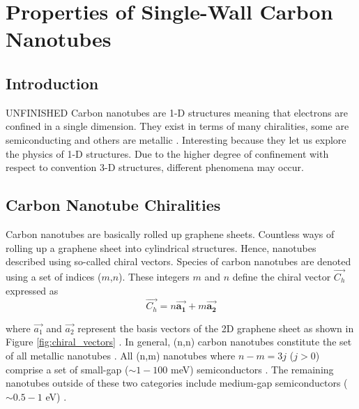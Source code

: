 \chapter{Properties of Single-Wall Carbon Nanotubes}

\section{Introduction}
{\color{red}UNFINISHED} Carbon nanotubes are 1-D structures meaning that electrons are confined in a single dimension. They exist in terms of many chiralities, some are semiconducting and others are metallic \cite{soavi2016ultrafast}. Interesting because they let us explore the physics of 1-D structures. Due to the higher degree of confinement with respect to convention 3-D structures, different phenomena may occur.



\section{Carbon Nanotube Chiralities}

Carbon nanotubes are basically rolled up graphene sheets. Countless ways of rolling up a graphene sheet into cylindrical structures. Hence, nanotubes described using so-called chiral vectors. Species of carbon nanotubes are denoted using a set of indices ($m$,$n$). These integers $m$ and $n$ define the chiral vector $\vec{C_h }$ expressed as 
\begin{equation}
	\vec{C_h} = n \bm{\vec{a_1}} + m \bm{\vec{a_2}}
\end{equation}

where $\vec{a_1}$ and $\vec{a_2}$ represent the basis vectors of the 2D graphene sheet as shown in Figure \ref{fig:chiral_vectors} \cite{nanot2012optoelectronic}. In general, (n,n) carbon nanotubes constitute the set of all metallic nanotubes \cite{nanot2012optoelectronic}. All (n,m) nanotubes where $n-m = 3j$ ($j > 0$) comprise a set of small-gap ($\sim1 - 100$ meV) semiconductors \cite{nanot2012optoelectronic}. The remaining nanotubes outside of these two categories include medium-gap semiconductors ($\sim0.5 - 1$ eV) \cite{nanot2012optoelectronic}.

